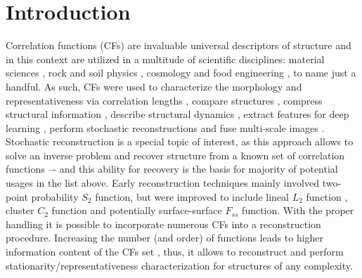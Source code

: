 \documentclass[reprint,amsmath,amssymb,aps,pre,showkeys,showpacs]{revtex4-1}
\begin{document}
\maketitle

\section{Introduction}
Correlation functions (CFs) are invaluable universal descriptors of structure
and in this context are utilized in a multitude of scientific disciplines:
material sciences \cite{Cecen,chen2022quantifying}, rock
\cite{ledesma2018effect} and soil physics
\cite{Euras2012,PLoS_ONE,KarsaninaEJSS}, cosmology \cite{TakadaJain} and food
engineering \cite{Derossi2019}, to name just a handful. As such, CFs were used
to characterize the morphology \cite{tensorPRE} and representativeness via
correlation lengths \cite{vcapek2011transport,thovert2011grain}, compare
structures \cite{jiao2014chawla,EPL1,REVpaper}, compress structural information
\cite{SciRep1,Havelka,KarsaninaEJSS}, describe structural dynamics
\cite{chen2015dynamic,PLoS_ONE,xu2022correlation}, extract features for deep
learning \cite{Miao2017,kamrava2020linking,roding2020predicting,KarsaninaEJSS},
perform stochastic reconstructions
\cite{Adler_recon,Y-T,EPL2,tahmasebiPRL,karsaninaPRL} and fuse multi-scale
images \cite{SciRep1,chen2016stochastic,Geoderma2018}. Stochastic reconstruction
is a special topic of interest, as this approach allows to solve an inverse
problem and recover structure from a known set of correlation functions –- and
this ability for recovery is the basis for majority of potential usages in the
list above. Early reconstruction techniques mainly involved two-point
probability $S_2$ function, but were improved to include lineal $L_2$ function
\cite{Y-T,vcapek2009stochastic,vcapek2011transport}, cluster $C_2$ function
\cite{JiaoPNAS,jiao2014chawla} and potentially surface-surface $F_{ss}$
function. With the proper handling \cite{EPL2} it is possible to incorporate
numerous CFs into a reconstruction procedure. Increasing the number (and order)
of functions leads to higher information content of the CFs set
\cite{Gommes1,Gommes2}, thus, it allows to reconstruct and perform
stationarity/representativeness characterization \cite{REVpaper} for structures
of any complexity.
\end{document}
